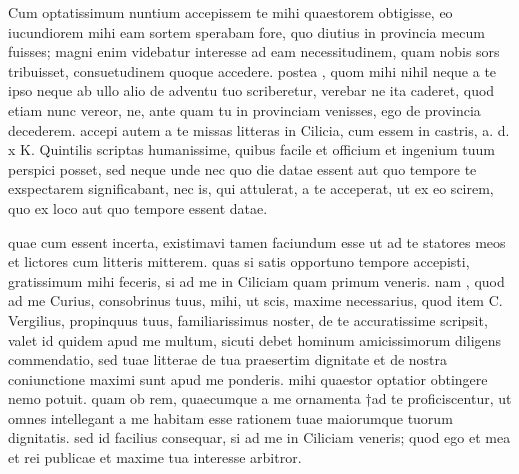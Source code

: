 


 Cum optatissimum nuntium accepissem te mihi quaestorem obtigisse, eo iucundiorem mihi eam sortem sperabam fore, quo diutius in provincia mecum fuisses; magni enim videbatur interesse ad eam necessitudinem, quam nobis sors tribuisset, consuetudinem quoque accedere. postea , quom mihi nihil neque a te ipso neque ab ullo alio de adventu tuo scriberetur, verebar ne ita caderet, quod etiam nunc vereor, ne, ante quam tu in provinciam venisses, ego de provincia decederem. accepi autem a te missas litteras in Cilicia, cum essem in castris, a. d. x K. Quintilis scriptas humanissime, quibus facile et officium et ingenium tuum perspici posset, sed neque unde nec quo die datae essent aut quo tempore te exspectarem significabant, nec is, qui attulerat, a te acceperat, ut ex eo scirem, quo ex loco aut quo tempore essent datae.

 quae cum essent incerta, existimavi tamen faciundum esse ut ad te statores meos et lictores cum litteris mitterem. quas si satis opportuno tempore accepisti, gratissimum mihi feceris, si ad me in Ciliciam quam primum veneris. nam , quod ad me Curius, consobrinus tuus, mihi, ut scis, maxime necessarius, quod item C. Vergilius, propinquus tuus, familiarissimus noster, de te accuratissime scripsit, valet id quidem apud me multum, sicuti debet hominum amicissimorum diligens commendatio, sed tuae litterae de tua praesertim dignitate et de nostra coniunctione maximi sunt apud me ponderis. mihi quaestor optatior obtingere nemo potuit. quam ob rem, quaecumque a me ornamenta †ad te proficiscentur, ut omnes intellegant a me habitam esse rationem tuae maiorumque tuorum dignitatis. sed id facilius consequar, si ad me in Ciliciam veneris; quod ego et mea et rei publicae et maxime tua interesse arbitror.
